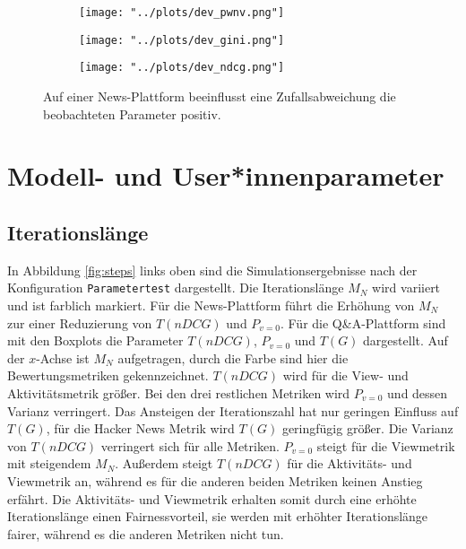 \begin{figure}[!h]
	\begin{subfigure}{0.5\textwidth}
		\texttt{[image: "../plots/dev\_pwnv.png"]}
	\end{subfigure}
	\begin{subfigure}{0.5\textwidth}
		\texttt{[image: "../plots/dev\_gini.png"]}
	\end{subfigure}
	\begin{subfigure}{0.5\textwidth}
		\texttt{[image: "../plots/dev\_ndcg.png"]}
	\end{subfigure}
	\caption{Auf einer News-Plattform beeinflusst eine Zufallsabweichung die beobachteten Parameter positiv.}
	\label{fig:zufall}	
\end{figure}


\section{Modell- und User*innenparameter}

\subsection{Iterationslänge}

In Abbildung \ref{fig:steps} links oben sind die Simulationsergebnisse nach der Konfiguration \texttt{Parametertest} dargestellt. Die Iterationslänge $M_N$ wird variiert und ist farblich markiert. Für die News-Plattform führt die Erhöhung von $M_N$ zur einer Reduzierung von $T(nDCG)$ und $P_{v=0}$. Für die Q\&A-Plattform sind mit den Boxplots die Parameter $T(nDCG)$, $P_{v=0}$ und $T(G)$ dargestellt. Auf der $x$-Achse ist $M_N$ aufgetragen, durch die Farbe sind hier die Bewertungsmetriken gekennzeichnet. $T(nDCG)$ wird für die View- und Aktivitätsmetrik größer. Bei den drei restlichen Metriken wird $P_{v=0}$ und dessen Varianz verringert. Das Ansteigen der Iterationszahl hat nur geringen Einfluss auf $T(G)$, für die Hacker News Metrik wird $T(G)$ geringfügig größer. Die Varianz von $T(nDCG)$ verringert sich für alle Metriken. $P_{v=0}$ steigt für die Viewmetrik mit steigendem $M_N$. Außerdem steigt $T(nDCG)$ für die Aktivitäts- und Viewmetrik an, während es für die anderen beiden Metriken keinen Anstieg erfährt. Die Aktivitäts- und Viewmetrik erhalten somit durch eine erhöhte Iterationslänge einen Fairnessvorteil, sie werden mit erhöhter Iterationslänge fairer, während es die anderen Metriken nicht tun.


